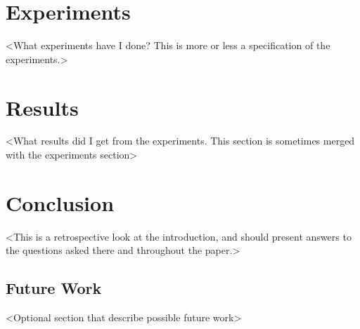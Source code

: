 \documentclass[10pt,twocolumn]{article}
\begin{document}
\section{Experiments}
<What experiments have I done? This is more or less a specification of the experiments.>

\section{Results}
<What results did I get from the experiments. This section is sometimes merged with the experiments section>

\section{Conclusion}
<This is a retrospective look at the introduction, and should present answers to the questions asked there and throughout the paper.>

\subsection{Future Work}
<Optional section that describe possible future work>



\end{document}
